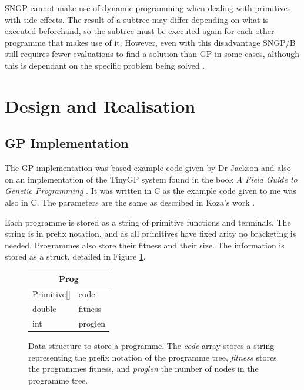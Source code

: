 \documentclass{article}
\begin{document}
        SNGP cannot make use of dynamic programming when dealing with primitives with side effects. The result of a subtree may differ depending on what is executed beforehand, so the subtree must be executed again for each other programme that makes use of it. However, even with this disadvantage SNGP/B still requires fewer evaluations to find a solution than GP in some cases, although this is dependant on the specific problem being solved \cite{jackson_single_2012}.
        
	\section{Design and Realisation}
	
	\subsection{GP Implementation}
	
        The GP implementation was based example code given by Dr Jackson and also on an implementation of the TinyGP system found in the book \textit{A Field Guide to Genetic
            Programming} \cite{poli_field_2008}. It was written in C as the example code given to me was also in C. The parameters are the same as described in Koza's work \cite{kinnear_generality_1993}.
        
        Each programme is stored as a string of primitive functions and terminals. The string is in prefix notation, and as all primitives have fixed arity no bracketing is needed. Programmes also store their fitness and their size. The information is stored as a struct, detailed in Figure \ref{struct:gp_prog}.
        
        \begin{figure}[h]
            \centering
            \begin{tabular}{|l l|}
                \hline
                \multicolumn{2}{|c|}{Prog}\\
                \hline
                Primitive[] & code \\
                double & fitness\\
                int & proglen\\
                \hline
            \end{tabular}
            \caption{Data structure to store a programme. The \textit{code} array stores a string representing the prefix notation of the programme tree, \textit{fitness} stores the programmes fitness, and \textit{proglen} the number of nodes in the programme tree.}
            
            \label{struct:gp_prog}
        \end{figure}
        
\end{document}
